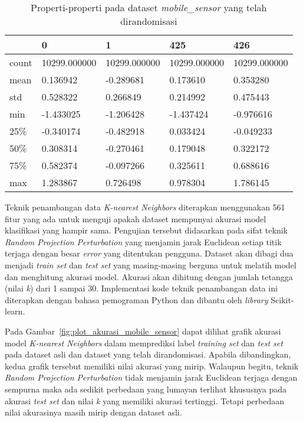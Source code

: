\begin{table}
	\centering
	\caption{Properti-properti pada dataset \textit{mobile\_sensor} yang telah dirandomisasi}
	\begin{tabular}{l|llll}
		\hline
		& 0 & 1 & 425 & 426 \\ \hline
		count & 10299.000000 & 10299.000000 & 10299.000000 & 10299.000000 \\
		mean & 0.136942 & -0.289681 & 0.173610 & 0.353280 \\
		std & 0.528322 & 0.266849 & 0.214992 & 0.475443 \\
		min & -1.433025 & -1.206428 & -1.437424 & -0.976616 \\
		25\% & -0.340174 & -0.482918 & 0.033424 & -0.049233 \\
		50\% & 0.308314 & -0.270461 & 0.179048 & 0.322172 \\
		75\% & 0.582374 & -0.097266 & 0.325611 & 0.688616 \\
		max & 1.283867 & 0.726498 & 0.978304 & 1.786145 \\
		\hline
	\end{tabular}
	\label{table:properti-mobile-sensor-asli}
\end{table}

Teknik penambangan data \textit{K-nearest Neighbors} diterapkan menggunakan 561 fitur yang ada untuk menguji apakah dataset mempunyai akurasi model klasifikasi yang hampir sama. Pengujian tersebut didasarkan pada sifat teknik \textit{Random Projection Perturbation} yang menjamin jarak Euclidean setiap titik terjaga dengan besar \textit{error} yang ditentukan pengguna. Dataset akan dibagi dua menjadi \textit{train set} dan \textit{test set} yang masing-masing berguna untuk melatih model dan menghitung akurasi model. Akurasi akan dihitung dengan jumlah tetangga (nilai \textit{k}) dari 1 sampai 30. Implementasi kode teknik penambangan data ini diterapkan dengan bahasa pemograman Python dan dibantu oleh \textit{library} Scikit-learn.

Pada Gambar~\ref{fig:plot_akurasi_mobile_sensor} dapat dilihat grafik akurasi model \textit{K-nearest Neighbors} dalam memprediksi label \textit{training set} dan \textit{test set} pada dataset asli dan dataset yang telah dirandomisasi. Apabila dibandingkan, kedua grafik tersebut memiliki nilai akurasi yang mirip. Walaupun begitu, teknik \textit{Random Projection Perturbation} tidak menjamin jarak Euclidean terjaga dengan sempurna maka ada sedikit perbedaan yang lumayan terlihat khususnya pada akurasi \textit{test set} dan nilai \textit{k} yang memiliki akurasi tertinggi. Tetapi perbedaan nilai akurasinya masih mirip dengan dataset asli.

